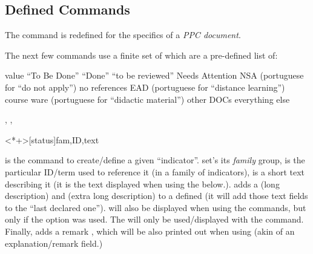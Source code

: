 \documentclass[article,nogeometry,english,tocdepth=3,secdepth=3]{ufrgscca} %
\begin{document}
\subsection{Defined Commands}
\begin{codedescribe}{\maketitle}
    \begin{codesyntax}%
        \tsmacro{\maketitle}{}
    \end{codesyntax}
The command \tsmacro{\maketitle}{} is redefined for the specifics of a \emph{PPC document}.
\end{codedescribe}

The next few commands use a finite set of  which are a pre-defined list of:
\begin{describelist*}{value}
     { “To Be Done”}
     { “Done”}
     { “to be reviewed”}
     { Needs Attention}
     { NSA (portuguese for “do not apply”)}
     { no references}
     { EAD (portuguese for “distance learning”)}
     { course ware (portuguese for “didactic material”) }
     { other DOCs}
     { everything else}
\end{describelist*}

\begin{codedescribe}{\declareindicator, \indicatorDesc, \indicatorText}
	\begin{codesyntax}%
		\tsmacro{\declareindicator}<*+>[status]{fam,ID,text}
	\end{codesyntax}
\tsmacro{\declareindicator}{} is the command to create/define a given “indicator”.  set's its \emph{family} group,  is the particular ID/term used to reference it (in a family of indicators),  is a short text describing it (it is the text displayed when using the \tsmacro{\indref}{} below.). \tsmacro{\indicatorDesc}{} adds a  (long description) and  (extra long description) to a defined \tsmacro{\declareindicator}{} (it will add those text fields to the “last declared one”).  will also be displayed when using the \tsmacro{\indref}{} commands, but only if the  option was used. The  will only be used/displayed with the \tsmacro{\PrintIndicators}{} command. Finally,  adds a remark , which will be also printed out when using  \tsmacro{\lstind}{} (akin of an explanation/remark field.)
\end{codedescribe}
\end{document}
